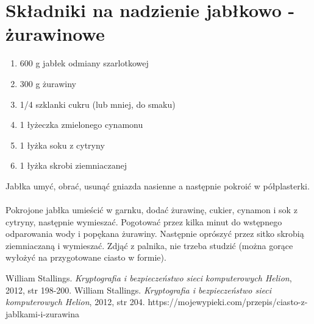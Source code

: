 \documentclass[12pt, letterpaper, titlepage]{article}
\begin{document}
\section*{Składniki na nadzienie jabłkowo - żurawinowe}
\begin{enumerate}[•]
\item 600 g jabłek odmiany szarlotkowej
\item 300 g żurawiny
\item 1/4 szklanki cukru (lub mniej, do smaku)
\item 1 łyżeczka zmielonego cynamonu
\item 1 łyżka soku z cytryny
\item 1 łyżka skrobi ziemniaczanej
\end{enumerate}
Jabłka umyć, obrać, usunąć gniazda nasienne a następnie pokroić w półplasterki.\\
\\
Pokrojone jabłka umieścić w garnku, dodać żurawinę, cukier, cynamon i sok z cytryny, następnie
wymieszać. Pogotować przez kilka minut do wstępnego odparowania wody i popękana
żurawiny. Następnie oprószyć przez sitko skrobią ziemniaczaną i wymieszać. Zdjąć z palnika, nie trzeba studzić (można gorące wyłożyć na przygotowane ciasto w formie).
\newpage
\begin{thebibliography}{1}
William Stallings.
\textit{Kryptografia i bezpieczeństwo sieci komputerowych Helion}, 2012, str 198-200.
William Stallings.
\textit{Kryptografia i bezpieczeństwo sieci komputerowych Helion}, 2012, str 204.
https://mojewypieki.com/przepis/ciasto-z-jablkami-i-zurawina
\end{thebibliography}
\end{document}
